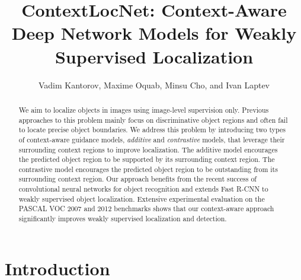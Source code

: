 \documentclass[runningheads]{llncs}
\begin{document}
\newcommand{\etal}{\textit{et al}.}
\newcommand{\ie}{\textit{i}.\textit{e}., }
\newcommand{\eg}{\textit{e}.\textit{g}.}

\pagestyle{headings}
\mainmatter

\def\fixme#1{\textcolor{red}{[#1]}\marginpar{\textcolor{red}{FIXME}}}

\def\checked#1{#1}

\title{ContextLocNet: Context-Aware Deep Network Models for Weakly Supervised Localization} %


\authorrunning{V. Kantorov \etal}

\author{Vadim Kantorov, Maxime Oquab, Minsu Cho, and Ivan Laptev}




\maketitle

\begin{abstract}
We aim to localize objects in images using image-level supervision only.
Previous approaches to this problem mainly focus on discriminative object
regions and often fail to locate precise object boundaries. 
We address this problem by introducing two types of context-aware guidance models, {\em additive
} and {\em contrastive} models, that leverage their surrounding context regions to improve localization. 
The additive model encourages the predicted object region to be
supported by its surrounding context region. 
The contrastive model encourages the
predicted object region to be outstanding from its surrounding context region.
Our approach benefits from the recent success of convolutional neural networks
for object recognition and extends Fast R-CNN to weakly supervised object localization.
Extensive experimental evaluation on the PASCAL VOC 2007 and 2012 benchmarks shows that our context-aware approach significantly improves weakly supervised localization and detection.

\end{abstract}

\section{Introduction}
\end{document}
